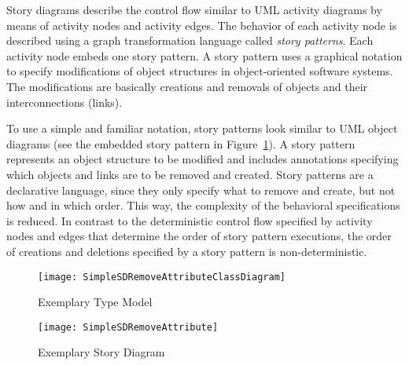 Story diagrams describe the control flow similar to UML activity diagrams by means of activity nodes and activity edges.
The behavior of each activity node is described using a graph transformation language called \emph{story patterns}.
Each activity node embeds one story pattern.
A story pattern uses a graphical notation to specify modifications of object structures in object-oriented software systems.
The modifications are basically creations and removals of objects and their interconnections (links).


To use a simple and familiar notation, story patterns look similar to UML object diagrams (see the embedded story pattern in Figure~\ref{fig:SDExampleStoryDiagram}).
A story pattern represents an object structure to be modified and includes annotations specifying which objects and links are to be removed and created.
Story patterns are a declarative language, since they only specify what to remove and create, but not how and in which order.
This way, the complexity of the behavioral specifications is reduced.
In contrast to the deterministic control flow specified by activity nodes and edges that determine the order of story pattern executions,
the order of creations and deletions specified by a story pattern is non-deterministic.

\begin{figure}[htb]
	\centering
  \begin{minipage}[t]{.4\textwidth}
    \centering
    \texttt{[image: SimpleSDRemoveAttributeClassDiagram]} 
    \caption{Exemplary Type Model}
    \label{fig:SDExampleClassDiagram}
  \end{minipage}%
  \hfill
  \begin{minipage}[t]{.55\textwidth}
    \centering
    \texttt{[image: SimpleSDRemoveAttribute]}
    \caption{Exemplary Story Diagram}
    \label{fig:SDExampleStoryDiagram}
  \end{minipage}
\end{figure}


